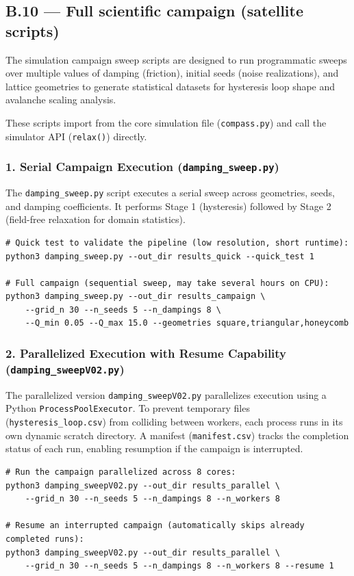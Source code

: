 \documentclass[11pt,a4paper]{article}
\newcommand{\code}[1]{\texttt{#1}}
\begin{document}
\subsection*{B.10 --- Full scientific campaign (satellite scripts)}

The simulation campaign sweep scripts are designed to run programmatic sweeps over multiple values of damping (friction), initial seeds (noise realizations), and lattice geometries to generate statistical datasets for hysteresis loop shape and avalanche scaling analysis. 

These scripts import from the core simulation file (\code{compass.py}) and call the simulator API (\code{relax()}) directly.

\subsubsection*{1. Serial Campaign Execution (\code{damping\_sweep.py})}
The \code{damping\_sweep.py} script executes a serial sweep across geometries, seeds, and damping coefficients. It performs Stage 1 (hysteresis) followed by Stage 2 (field-free relaxation for domain statistics).

\begin{verbatim}
# Quick test to validate the pipeline (low resolution, short runtime):
python3 damping_sweep.py --out_dir results_quick --quick_test 1

# Full campaign (sequential sweep, may take several hours on CPU):
python3 damping_sweep.py --out_dir results_campaign \
    --grid_n 30 --n_seeds 5 --n_dampings 8 \
    --Q_min 0.05 --Q_max 15.0 --geometries square,triangular,honeycomb
\end{verbatim}

\subsubsection*{2. Parallelized Execution with Resume Capability (\code{damping\_sweepV02.py})}
The parallelized version \code{damping\_sweepV02.py} parallelizes execution using a Python \code{ProcessPoolExecutor}. To prevent temporary files (\code{hysteresis\_loop.csv}) from colliding between workers, each process runs in its own dynamic scratch directory. A manifest (\code{manifest.csv}) tracks the completion status of each run, enabling resumption if the campaign is interrupted.

\begin{verbatim}
# Run the campaign parallelized across 8 cores:
python3 damping_sweepV02.py --out_dir results_parallel \
    --grid_n 30 --n_seeds 5 --n_dampings 8 --n_workers 8

# Resume an interrupted campaign (automatically skips already completed runs):
python3 damping_sweepV02.py --out_dir results_parallel \
    --grid_n 30 --n_seeds 5 --n_dampings 8 --n_workers 8 --resume 1
\end{verbatim}
\end{document}
